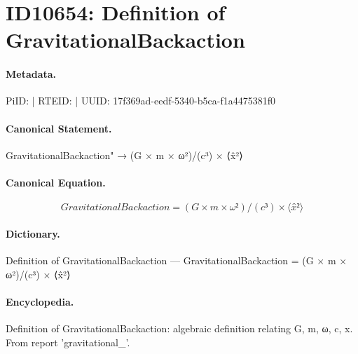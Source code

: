 \section*{ID10654: Definition of GravitationalBackaction}
\paragraph{Metadata.}
PiID:  | RTEID:  | UUID: 17f369ad-eedf-5340-b5ca-f1a4475381f0

\paragraph{Canonical Statement.}
GravitationalBackaction" → (G × m × ω²)/(c³) × ⟨x̂²⟩

\paragraph{Canonical Equation.}
\[
GravitationalBackaction = (G × m × ω²)/(c³) × ⟨x̂²⟩
\]

\paragraph{Dictionary.}
Definition of GravitationalBackaction — GravitationalBackaction = (G × m × ω²)/(c³) × ⟨x̂²⟩

\paragraph{Encyclopedia.}
Definition of GravitationalBackaction: algebraic definition relating G, m, ω, c, x. From report 'gravitational\_'.
